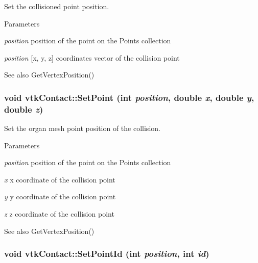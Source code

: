 Set the collisioned point position. 
\begin{DoxyParams}{Parameters}
\item[{\em position}]position of the point on the Points collection \item[{\em position}]\mbox{[}x, y, z\mbox{]} coordinates vector of the collision point \end{DoxyParams}
\begin{DoxySeeAlso}{See also}
GetVertexPosition() 
\end{DoxySeeAlso}
\hypertarget{classvtkContact_adbd7a32c9ded4eef1c0f52e3aa222a30}{
\subsubsection[{SetPoint}]{\setlength{\rightskip}{0pt plus 5cm}void vtkContact::SetPoint (int {\em position}, \/  double {\em x}, \/  double {\em y}, \/  double {\em z})}}
\label{classvtkContact_adbd7a32c9ded4eef1c0f52e3aa222a30}


Set the organ mesh point position of the collision. 
\begin{DoxyParams}{Parameters}
\item[{\em position}]position of the point on the Points collection \item[{\em x}]x coordinate of the collision point \item[{\em y}]y coordinate of the collision point \item[{\em z}]z coordinate of the collision point \end{DoxyParams}
\begin{DoxySeeAlso}{See also}
GetVertexPosition() 
\end{DoxySeeAlso}
\hypertarget{classvtkContact_ac0b98ed46f961f3b2c2357905bf069f6}{
\subsubsection[{SetPointId}]{\setlength{\rightskip}{0pt plus 5cm}void vtkContact::SetPointId (int {\em position}, \/  int {\em id})}}
\label{classvtkContact_ac0b98ed46f961f3b2c2357905bf069f6}



